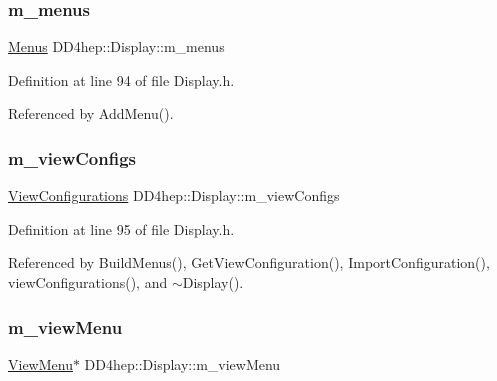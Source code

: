 \subsubsection{\texorpdfstring{m\+\_\+menus}{m\_menus}}
{\footnotesize\ttfamily \hyperlink{class_d_d4hep_1_1_display_a4dbc259bd581b56802ef3c29b72909be}{Menus} D\+D4hep\+::\+Display\+::m\+\_\+menus\hspace{0.3cm}{\ttfamily [protected]}}



Definition at line 94 of file Display.\+h.



Referenced by Add\+Menu().

\hypertarget{class_d_d4hep_1_1_display_aaa73b23932af6bf1d1f1e37d621e564c}{}\label{class_d_d4hep_1_1_display_aaa73b23932af6bf1d1f1e37d621e564c} 
\subsubsection{\texorpdfstring{m\+\_\+view\+Configs}{m\_viewConfigs}}
{\footnotesize\ttfamily \hyperlink{class_d_d4hep_1_1_display_a1bb7fbc1eeb22ef2b1cea35c78e9d27a}{View\+Configurations} D\+D4hep\+::\+Display\+::m\+\_\+view\+Configs\hspace{0.3cm}{\ttfamily [protected]}}



Definition at line 95 of file Display.\+h.



Referenced by Build\+Menus(), Get\+View\+Configuration(), Import\+Configuration(), view\+Configurations(), and $\sim$\+Display().

\hypertarget{class_d_d4hep_1_1_display_a363cb8c67d3fafa5a0847b3ad71dba05}{}\label{class_d_d4hep_1_1_display_a363cb8c67d3fafa5a0847b3ad71dba05} 
\subsubsection{\texorpdfstring{m\+\_\+view\+Menu}{m\_viewMenu}}
{\footnotesize\ttfamily \hyperlink{class_d_d4hep_1_1_view_menu}{View\+Menu}$\ast$ D\+D4hep\+::\+Display\+::m\+\_\+view\+Menu\hspace{0.3cm}{\ttfamily [protected]}}



